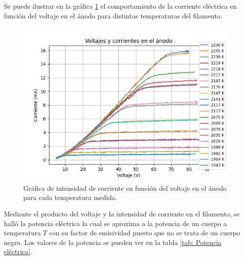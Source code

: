 \documentclass[%
 reprint,
 amsmath,amssymb,
 aps,
]{revtex4-2}
\begin{document}
\vspace{0.2 cm}
Se puede ilustrar en la gráfica \ref{fig: Gráfica de Voltaje vs Corriente ánodo} el comportamiento de la corriente eléctrica en función del voltaje en el ánodo para distintas temperaturas del filamento.

\begin{figure}[H]
    \centering
    \includegraphics[width= 1\linewidth]{../src/graficas/Gráfica de Voltaje vs Corriente ánodo.png}
    \caption{Gráfica de intensidad de corriente en función del voltaje en el ánodo para cada temperatura medida.}
    \label{fig: Gráfica de Voltaje vs Corriente ánodo}
\end{figure}

\vspace{0.2 cm}
Mediante el producto del voltaje y la intensidad de corriente en el filamento, se halló la potencia eléctrica la cual se aproxima a la potencia de un cuerpo a temperatura $T$ con su factor de emisividad puesto que no se trata de un cuerpo negro. Los valores de la potencia se pueden ver en la tabla \ref{tab: Potencia eléctrica}.
\end{document}
